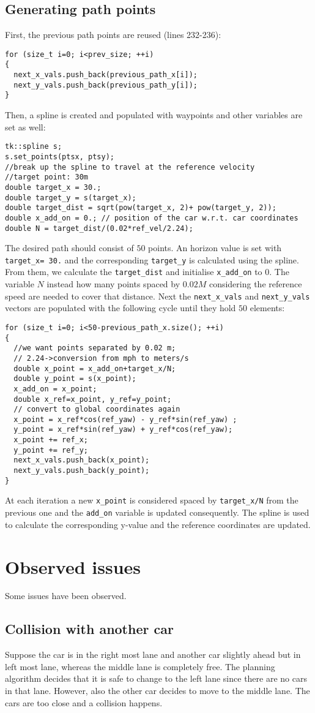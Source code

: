 \documentclass{article}
\let\cd\lstinline
\begin{document}
\subsection{Generating path points}
First, the previous path points are reused (lines 232-236):
\begin{lstlisting}
for (size_t i=0; i<prev_size; ++i)
{
  next_x_vals.push_back(previous_path_x[i]);
  next_y_vals.push_back(previous_path_y[i]);
}
\end{lstlisting}
Then, a spline is created and populated with waypoints and other variables are set as well:
\begin{lstlisting}
tk::spline s;
s.set_points(ptsx, ptsy);
//break up the spline to travel at the reference velocity
//target point: 30m
double target_x = 30.;
double target_y = s(target_x);
double target_dist = sqrt(pow(target_x, 2)+ pow(target_y, 2));
double x_add_on = 0.; // position of the car w.r.t. car coordinates
double N = target_dist/(0.02*ref_vel/2.24);
\end{lstlisting}
The desired path should consist of $50$ points. An horizon value is set with \cd+target_x= 30.+ and the corresponding \cd+target_y+ is calculated using the spline. From them, we calculate the \cd+target_dist+ and initialise \cd+x_add_on+ to $0$. The variable $N$ instead how many points spaced by $0.02M$ considering the reference speed are needed to cover that distance.
Next the \cd+next_x_vals+ and \cd+next_y_vals+ vectors are populated with the following cycle until they hold $50$ elements:
\begin{lstlisting}
for (size_t i=0; i<50-previous_path_x.size(); ++i)
{
  //we want points separated by 0.02 m;
  // 2.24->conversion from mph to meters/s
  double x_point = x_add_on+target_x/N;
  double y_point = s(x_point);
  x_add_on = x_point;
  double x_ref=x_point, y_ref=y_point;
  // convert to global coordinates again
  x_point = x_ref*cos(ref_yaw) - y_ref*sin(ref_yaw) ;
  y_point = x_ref*sin(ref_yaw) + y_ref*cos(ref_yaw);
  x_point += ref_x;
  y_point += ref_y;
  next_x_vals.push_back(x_point);
  next_y_vals.push_back(y_point);
}
\end{lstlisting}
At each iteration a new \cd+x_point+ is considered spaced by \cd+target_x/N+ from the previous one and the \cd+add_on+ variable is updated consequently. The spline is used to calculate the corresponding y-value and the reference coordinates are updated. 

\section{Observed issues}
Some issues have been observed.
\subsection{Collision with another car}
Suppose the car is in the right most lane and another car slightly ahead but in left most lane, whereas the middle lane is completely free. The planning algorithm decides that it is safe to change to the left lane since there are no cars in that lane. However, also the other car decides to move to the middle lane. The cars are too close and a collision happens.
\end{document}
